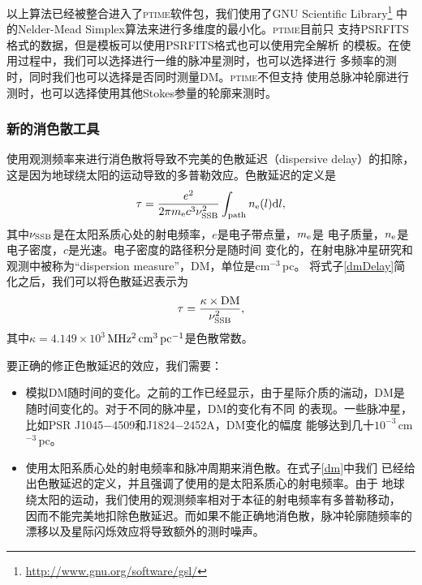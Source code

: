 以上算法已经被整合进入了\textsc{ptime}软件包，我们使用了GNU Scientific Library\footnote{\url{http://www.gnu.org/software/gsl/}} 中
的Nelder-Mead Simplex算法来进行多维度的最小化。\textsc{ptime}目前只
支持PSRFITS格式的数据，但是模板可以使用PSRFITS格式也可以使用完全解析
的模板。在使用过程中，我们可以选择进行一维的脉冲星测时，也可以选择进行
多频率的测时，同时我们也可以选择是否同时测量DM。\textsc{ptime}不但支持
使用总脉冲轮廓进行测时，也可以选择使用其他Stokes参量的轮廓来测时。

\subsubsection{新的消色散工具}

使用观测频率来进行消色散将导致不完美的色散延迟（dispersive delay）的扣除，
这是因为地球绕太阳的运动导致的多普勒效应。色散延迟的定义是
\begin{equation}
\label{dmDelay}
\tau=\frac{e^2}{2\pi m_{\rm{e}}c^3\nu_{\rm{SSB}}^2}\int_{\rm{path}}n_{\rm{e}}(l){\rm{d}}l,
\end{equation}
其中$\nu_{\rm{SSB}}$是在太阳系质心处的射电频率，$e$是电子带点量，$m_{\rm{e}}$是
电子质量，$n_{\rm{e}}$是电子密度，$c$是光速。电子密度的路径积分是随时间
变化的，在射电脉冲星研究和观测中被称为“dispersion measure”，DM，单位是cm$^{-3}$\,pc。
将式子\ref{dmDelay}简化之后，我们可以将色散延迟表示为
\begin{equation}
\tau=\frac{\kappa\times \rm{DM}}{\nu_{\rm{SSB}}^{2}},
\end{equation}
%
其中$\kappa=4.149\times 10^{3}$\,$\rm{MHz^{2}\,cm^{3}\,pc^{-1}}$是色散常数。

要正确的修正色散延迟的效应，我们需要：
\begin{itemize}
\item 模拟DM随时间的变化。之前的工作已经显示，由于星际介质的湍动，DM是
随时间变化的\supercite{yhc+07,Keith13}。对于不同的脉冲星，DM的变化有不同
的表现。一些脉冲星，比如PSR J1045$-$4509和J1824$-$2452A，DM变化的幅度
能够达到几十$10^{-3}$\,cm$^{-3}$\,pc。
\item 使用太阳系质心处的射电频率和脉冲周期来消色散。在式子\ref{dm}中我们
已经给出色散延迟的定义，并且强调了使用的是太阳系质心的射电频率。由于
地球绕太阳的运动，我们使用的观测频率相对于本征的射电频率有多普勒移动，
因而不能完美地扣除色散延迟。而如果不能正确地消色散，脉冲轮廓随频率的
漂移以及星际闪烁效应将导致额外的测时噪声。
\end{itemize}

